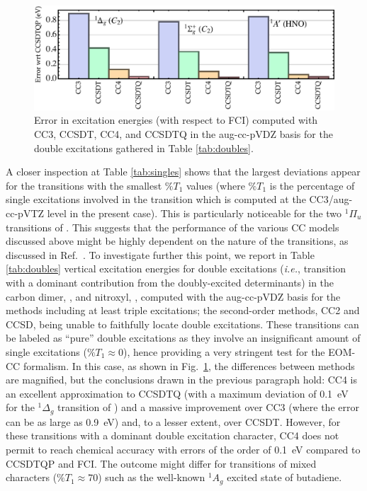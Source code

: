 \documentclass[aip,jcp,reprint,noshowkeys,superscriptaddress]{revtex4-1}
\newcommand{\ie}{\textit{i.e.}}
\begin{document}
\begin{figure}
	\includegraphics[width=0.7\linewidth]{fig2}
	\caption{
	Error in excitation energies (with respect to FCI) computed with CC3, CCSDT, CC4, and CCSDTQ in the aug-cc-pVDZ basis
	for the double excitations gathered in Table \ref{tab:doubles}.
	\label{fig:doubles}}
\end{figure}

A closer inspection at Table \ref{tab:singles} shows that the largest deviations appear for the transitions with the smallest $\%T_1$ values (where $\%T_1$ is the percentage of single excitations involved in the transition which is computed at the CC3/aug-cc-pVTZ level in the present case). 
This is particularly noticeable for the two $^1\Pi_u$ transitions of .
This suggests that the performance of the various CC models discussed above might be highly dependent on the nature of the transitions, as discussed in Ref.~.
To investigate further this point, we report in Table \ref{tab:doubles} vertical excitation energies for double excitations (\ie, transition with a dominant contribution from the doubly-excited determinants) in the carbon dimer, , and nitroxyl, , computed with the aug-cc-pVDZ basis for the methods including at least triple excitations; the second-order methods, CC2 and CCSD, being unable to faithfully locate double excitations.
These transitions can be labeled as ``pure'' double excitations as they involve an insignificant amount of single excitations ($\%T_1 \approx 0$), hence providing a very stringent test for the EOM-CC formalism.
In this case, as shown in Fig.~\ref{fig:doubles}, the differences between methods are magnified, but the conclusions drawn in the previous paragraph hold: CC4 is an excellent approximation to CCSDTQ (with a maximum deviation of \SI{0.1}{\eV} for the $^1\Delta_g$ transition of ) and a massive improvement over CC3 (where the error can be as large as \SI{0.9}{\eV}) and, to a lesser extent, over CCSDT.
However, for these transitions with a dominant double excitation character, CC4 does not permit to reach chemical accuracy with errors of the order of \SI{0.1}{\eV} compared to CCSDTQP and FCI.
The outcome might differ for transitions of mixed characters ($\%T_1 \approx 70$) such as the well-known $^1 A_g$ excited state of butadiene.\cite{Maitra_2004,Saha_2006,Watson_2012,Shu_2017,Barca_2018a,Loos_2019} 
\end{document}
